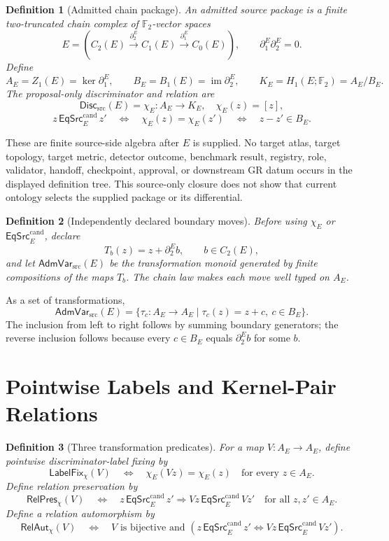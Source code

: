 \documentclass[11pt]{article}
\newtheorem{definition}{Definition}
\newcommand{\Ftwo}{\mathbb F_2}
\newcommand{\Disc}{\mathsf{Disc}_{\mathrm{src}}}
\newcommand{\AdmVar}{\mathsf{AdmVar}_{\mathrm{src}}}
\newcommand{\EqCand}{\mathsf{EqSrc}^{\mathrm{cand}}}
\newcommand{\LabelFix}{\mathsf{LabelFix}_{\chi}}
\newcommand{\RelPres}{\mathsf{RelPres}_{\chi}}
\newcommand{\RelAut}{\mathsf{RelAut}_{\chi}}
\begin{document}
\begin{definition}[Admitted chain package]
An admitted source package is a finite two-truncated chain complex of
\(\Ftwo\)-vector spaces
\[
E=\left(C_2(E)\xrightarrow{\partial_2^E}
C_1(E)\xrightarrow{\partial_1^E}C_0(E)\right),
\qquad \partial_1^E\partial_2^E=0.
\]
Define
\[
A_E=Z_1(E)=\ker\partial_1^E,\qquad
B_E=B_1(E)=\operatorname{im}\partial_2^E,\qquad
K_E=H_1(E;\Ftwo)=A_E/B_E.
\]
The proposal-only discriminator and relation are
\[
\Disc(E)=\chi_E:A_E\to K_E,\quad \chi_E(z)=[z],
\]
\[
z\,\EqCand_E\,z'
\quad\Longleftrightarrow\quad
\chi_E(z)=\chi_E(z')
\quad\Longleftrightarrow\quad z-z'\in B_E.
\]
\end{definition}

These are finite source-side algebra after \(E\) is supplied. No target atlas,
target topology, target metric, detector outcome, benchmark result, registry,
role, validator, handoff, checkpoint, approval, or downstream GR datum occurs
in the displayed definition tree. This source-only closure does not show that
current ontology selects the supplied package or its differential.

\begin{definition}[Independently declared boundary moves]
Before using \(\chi_E\) or \(\EqCand_E\), declare
\[
T_b(z)=z+\partial_2^E b,\qquad b\in C_2(E),
\]
and let \(\AdmVar(E)\) be the transformation monoid generated by finite
compositions of the maps \(T_b\). The chain law makes each move well typed on
\(A_E\).
\end{definition}

As a set of transformations,
\[
\AdmVar(E)=\{\tau_c:A_E\to A_E\mid
\tau_c(z)=z+c,\ c\in B_E\}.
\]
The inclusion from left to right follows by summing boundary generators; the
reverse inclusion follows because every \(c\in B_E\) equals
\(\partial_2^Eb\) for some \(b\).

\section{Pointwise Labels and Kernel-Pair Relations}

\begin{definition}[Three transformation predicates]
For a map \(V:A_E\to A_E\), define pointwise discriminator-label fixing by
\[
\LabelFix(V)
\quad\Longleftrightarrow\quad
\chi_E(Vz)=\chi_E(z)\quad\text{for every }z\in A_E.
\]
Define relation preservation by
\[
\RelPres(V)
\quad\Longleftrightarrow\quad
z\,\EqCand_E\,z'\Longrightarrow
Vz\,\EqCand_E\,Vz'
\quad\text{for all }z,z'\in A_E.
\]
Define a relation automorphism by
\[
\RelAut(V)
\quad\Longleftrightarrow\quad
V\text{ is bijective and }
\left(z\,\EqCand_E\,z'
\Longleftrightarrow Vz\,\EqCand_E\,Vz'\right).
\]
\end{definition}
\end{document}
